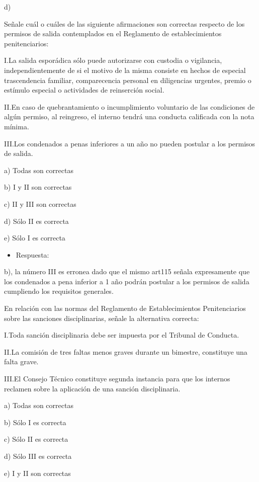 \documentclass[letterpaper, 11pt]{article}
\begin{document}
d)


Señale cuál o cuáles de las siguiente afirmaciones son correctas
respecto de los permisos de salida contemplados en el Reglamento de
establecimientos penitenciarios:


I.La salida esporádica sólo puede autorizarse con custodia o
vigilancia, independientemente de si el motivo de la misma consiste en
hechos de especial trascendencia familiar, comparecencia personal en
diligencias urgentes, premio o estímulo especial o actividades de
reinserción social.

II.En caso de quebrantamiento o incumplimiento voluntario de las
condiciones de algún permiso, al reingreso, el interno tendrá una
conducta calificada con la nota mínima.

III.Los condenados a penas inferiores a un año no pueden postular a
los permisos de salida.


a) Todas son correctas

b) I y II son correctas

c) II y III son correctas

d) Sólo II es correcta

e) Sólo I es correcta


\begin{itemize}
\item Respuesta:
\end{itemize}

b), la número III es erronea dado que el mismo art115 señala
expresamente que los condenados a pena inferior a 1 año podrán
postular a los permisos de salida cumpliendo los requisitos generales.

En relación con las normas del Reglamento de Establecimientos
Penitenciarios sobre las sanciones disciplinarias, señale la
alternativa correcta:


I.Toda sanción disciplinaria debe ser impuesta por el Tribunal de
Conducta.


II.La comisión de tres faltas menos graves durante un bimestre,
constituye una falta grave.

III.El Consejo Técnico constituye segunda instancia para que los
internos reclamen sobre la aplicación de una sanción disciplinaria.


a) Todas son correctas

b) Sólo I es correcta

c) Sólo II es correcta

d) Sólo III es correcta

e) I y II son correctas
\end{document}
